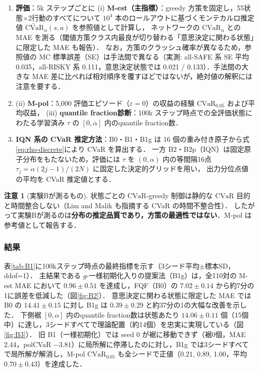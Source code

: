 \documentclass[a4paper,10pt]{jsarticle}
\theoremstyle{definition}
\newtheorem{remark}{注意}[section]
\newcommand{\CVaR}{\mathrm{CVaR}}
\begin{document}
\begin{enumerate}
  \item \textbf{評価}：5k ステップごとに (i) \textbf{M-est（主指標）}：greedy 方策を固定し，55状態$\times$2行動のすべてについて $10^4$ 本のロールアウトに基づくモンテカルロ推定値 $\widetilde{\mathrm{CVaR}}_\alpha(s,a)$ を参照値として計算し，
  ネットワークの $\CVaR_\alpha$ との MAE を測る（閾値方策クラス内最良が切り替わる「意思決定に関わる状態」に限定した MAE も報告）．
  なお，方策のクラッシュ確率が異なるため，参照値の MC 標準誤差（SE）は手法間で異なる（実測: all-SAFE 系 SE 平均 0.035，all-RISKY 系 0.111，意思決定状態では 0.021 / 0.133）．手法間の大きな MAE 差に比べれば相対順序を覆すほどではないが，絶対値の解釈には注意を要する．
  \item (ii) \textbf{M-pol}：5{,}000 評価エピソード（$\varepsilon=0$）の収益の経験 $\CVaR_{0.05}$ および平均収益，
  (iii) \textbf{quantile fraction診断}：100k ステップ時点での全評価状態にわたる学習済み $\tau$ の $[0,\alpha]$ 内のquantile fraction数．
  \item \textbf{IQN 系の CVaR 推定方法}：B0・B1・B1g は 16 個の重み付き原子から式\eqref{eq:rho-discrete}により CVaR を算出する．
  一方 B2・B2p（IQN）は固定原子分布をもたないため，評価には $\tau$ を $(0,\alpha)$ 内の等間隔16点 $\tau_j=\alpha(2j-1)/(2N)$ に固定した決定的グリッドを用い，
  出力分位点値の平均を CVaR 推定値とする．
\end{enumerate}

\begin{remark}[実験Bが測るもの]
状態ごとの $\CVaR$-greedy 制御は静的な $\CVaR$ 目的と時間整合しない（Lim and Malik \cite{lim2022distributional} も指摘する CVaR の時間不整合性）．
したがって実験Bが測るのは\textbf{分布の推定品質であり，方策の最適性ではない}．M-pol は参考値として報告する．
\end{remark}

\subsubsection{結果}
表\ref{tab:B1}に100kステップ時点の最終指標を示す（3シード平均$\pm$標本SD，ddof=1）．
主結果である $g$-一様初期化入りの提案法（B1g）は，全110対の M-est MAE において $0.96\pm0.51$ を達成し，FQF（B0）の $7.02\pm0.14$ から約7分の1に誤差を低減した（図\ref{fig:B2}）．
意思決定に関わる状態に限定した MAE では B0 の $14.41\pm0.15$ に対し B1g は $0.39\pm0.29$ と約37分の1の大幅な改善を示した．
下側裾 $[0,\alpha]$ 内のquantile fraction数は状態あたり $14.06\pm0.11$ 個（15個中）に達し，3シードすべてで理論配置（約14個）を忠実に実現している（図\ref{fig:B3}）．
旧 B1（一様初期化）では seed 0 が裾に移動できず（裾0個，MAE 2.44，polCVaR $-3.81$）に局所解に停滞したのに対し，B1g では3シードすべてで局所解が解消し，M-pol $\CVaR_{0.05}$ も全シードで正値（0.21, 0.89, 1.00，平均 $0.70\pm0.43$）を達成した．
\end{document}
